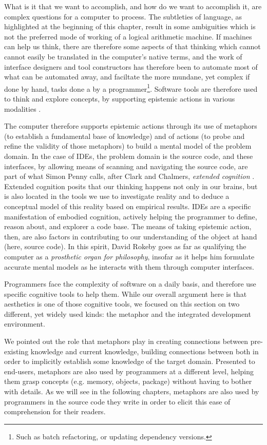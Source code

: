What is it that we want to accomplish, and how do we want to accomplish it, are complex questions for a computer to process. The subtleties of language, as highlighted at the beginning of this chapter, result in some ambiguities which is not the preferred mode of working of a logical arithmetic machine. If machines can help us think, there are therefore some aspects of that thinking which cannot cannot easily be translated in the computer's native terms, and the work of interface designers and tool constructors has therefore been to automate most of what can be automated away, and faciltate the more mundane, yet complex if done by hand, tasks done a by a programmer\footnote{Such as batch refactoring, or updating dependency versions.}. Software tools are therefore used to think and explore concepts, by supporting epistemic actions in various modalities \citep{victor_humane_2014}.

The computer therefore supports epistemic actions through its use of metaphors (to establish a fundamental base of knowledge) and of actions (to probe and refine the validity of those metaphors) to build a mental model of the problem domain. In the case of IDEs, the problem domain is the source code, and these interfaces, by allowing means of scanning and navigating the source code, are part of what Simon Penny calls, after Clark and Chalmers, \emph{extended cognition} \citep{penny_making_2019}. Extended cognition posits that our thinking happens not only in our brains, but is also located in the tools we use to investigate reality and to deduce a conceptual model of this reality based on empirical results. IDEs are a specific manifestation of embodied cognition, actively helping the programmer to define, reason about, and explorer a code base. The means of taking epistemic action, then, are also factors in contributing to our understanding of the object at hand (here, source code). In this spirit, David Rokeby goes as far as qualifying the computer as a \emph{prosthetic organ for philosophy}, insofar as it helps him formulate accurate mental models as he interacts with them through computer interfaces.

Programmers face the complexity of software on a daily basis, and therefore use specific cognitive tools to help them. While our overall argument here is that aesthetics is one of those cognitive tools, we focused on this section on two different, yet widely used kinds: the metaphor and the integrated development environment.

We pointed out the role that metaphors play in creating connections between pre-existing knowledge and current knowledge, building connections between both in order to implicitly establish some knowledge of the target domain. Presented to end-users, metaphors are also used by programmers at a different level, helping them grasp concepts (e.g. memory, objects, package) without having to bother with details. As we will see in the following chapters, metaphors are also used by programmers in the source code they write in order to elicit this ease of comprehension for their readers.

